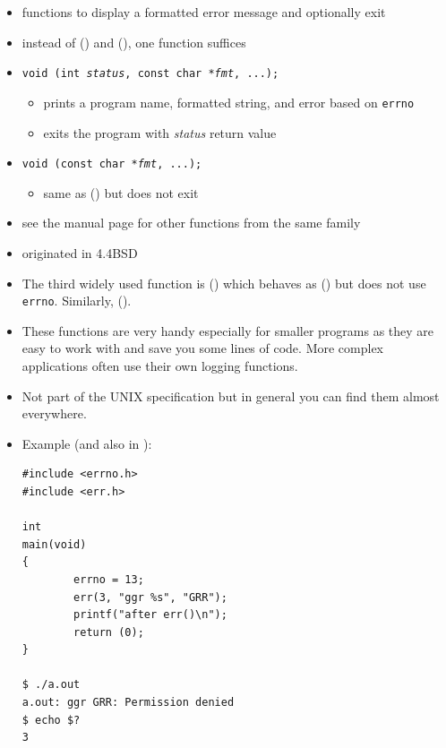 \begin{slide}
\setlength{\baselineskip}{0.8\baselineskip}
\begin{itemize}
\item functions to display a formatted error message and optionally exit
\item instead of () and (), one function suffices
\item
\texttt{void (int \emph{status}, const char *\emph{fmt}, ...);}
\begin{itemize}
\item prints a program name, formatted string, and error based on
\texttt{errno}
\item exits the program with \emph{status} return value
\end{itemize}
\item
\texttt{void (const char *\emph{fmt}, ...);}
\begin{itemize}
\item same as () but does not exit
\end{itemize}
\item see the manual page for other functions from the same family
\item originated in 4.4BSD
\end{itemize}
\end{slide}


\begin{itemize}
\label{ERR}
\item The third widely used function is () which behaves as
() but does not use \texttt{errno}.  Similarly, ().
\item These functions are very handy especially for smaller programs as they are
easy to work with and save you some lines of code.  More complex
app\-li\-ca\-tions often use their own logging functions.
\item Not part of the UNIX specification but in general you can find them almost
everywhere.
\item Example (and also in ):

\begin{verbatim}
#include <errno.h>
#include <err.h>

int
main(void)
{
        errno = 13;
        err(3, "ggr %s", "GRR");
        printf("after err()\n");
        return (0);
}

$ ./a.out 
a.out: ggr GRR: Permission denied
$ echo $?
3
\end{verbatim}

\end{itemize}

\endinput
